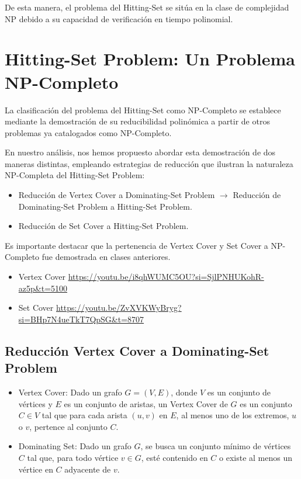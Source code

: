 De esta manera, el problema del Hitting-Set se sitúa en la clase de complejidad NP debido a su capacidad de verificación en tiempo polinomial. 

\section{Hitting-Set Problem: Un Problema NP-Completo}

La clasificación del problema del Hitting-Set como NP-Completo se establece mediante la demostración
de su reducibilidad polinómica a partir de otros problemas ya catalogados como NP-Completo. 

En nuestro análisis, nos hemos propuesto abordar esta demostración de dos maneras distintas, 
empleando estrategias de reducción que ilustran la naturaleza NP-Completa del Hitting-Set Problem:

\begin{itemize}
    \item Reducción de Vertex Cover a Dominating-Set Problem $\rightarrow$ Reducción de Dominating-Set Problem a Hitting-Set Problem.
    \item Reducción de Set Cover a Hitting-Set Problem.
\end{itemize}


Es importante destacar que la pertenencia de Vertex Cover y Set Cover a NP-Completo fue demostrada en clases anteriores.
\begin{itemize}
    \item  Vertex Cover \url{https://youtu.be/i8qhWUMC5OU?si=SjlPNHUKohR-az5p&t=5100}
    \item Set Cover \url{https://youtu.be/ZvXVKWyBryg?si=BHp7N4ueTkT7QpSG&t=8707}
\end{itemize}


\subsection{Reducción Vertex Cover a Dominating-Set Problem}

\begin{itemize}
    \item Vertex Cover: Dado un grafo $G=(V,E)$, donde $V$ es un conjunto de vértices y $E$ es un conjunto de aristas, un Vertex Cover de $G$ es un conjunto $C \in V$ tal que para cada arista $(u,v)$ en $E$, al menos uno de los extremos, $u$ o $v$, pertence al conjunto $C$.  
    \item Dominating Set: Dado un grafo $G$, se busca un conjunto mínimo de vértices $C$
    tal que, para todo vértice $v \in G$, esté contenido en $C$ o existe al menos un vértice en $C$ adyacente de $v$.
\end{itemize}

